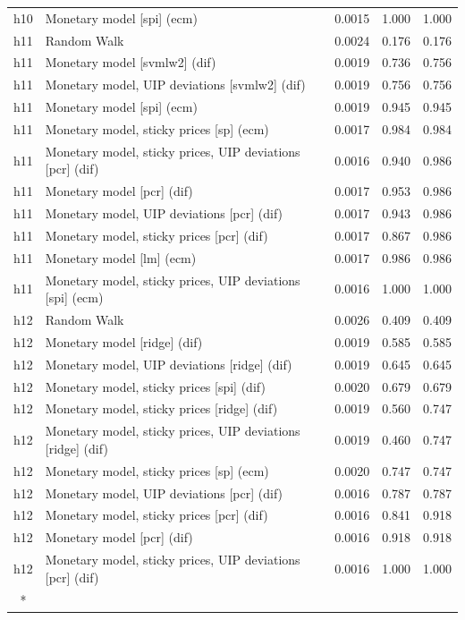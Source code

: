 \begin{ThreePartTable}
\begin{longtable}[t]{cp{5.5cm}ccc}
h10 & \raggedright Monetary model [spi] (ecm) & 0.0015 & 1.000 & 1.000\\
\addlinespace
h11 & \raggedright Random Walk & 0.0024 & 0.176 & 0.176\\
h11 & \raggedright Monetary model [svmlw2] (dif) & 0.0019 & 0.736 & 0.756\\
h11 & \raggedright Monetary model, UIP deviations [svmlw2] (dif) & 0.0019 & 0.756 & 0.756\\
h11 & \raggedright Monetary model [spi] (ecm) & 0.0019 & 0.945 & 0.945\\
h11 & \raggedright Monetary model, sticky prices [sp] (ecm) & 0.0017 & 0.984 & 0.984\\
h11 & \raggedright Monetary model, sticky prices, UIP deviations [pcr] (dif) & 0.0016 & 0.940 & 0.986\\
h11 & \raggedright Monetary model [pcr] (dif) & 0.0017 & 0.953 & 0.986\\
h11 & \raggedright Monetary model, UIP deviations [pcr] (dif) & 0.0017 & 0.943 & 0.986\\
h11 & \raggedright Monetary model, sticky prices [pcr] (dif) & 0.0017 & 0.867 & 0.986\\
h11 & \raggedright Monetary model [lm] (ecm) & 0.0017 & 0.986 & 0.986\\
h11 & \raggedright Monetary model, sticky prices, UIP deviations [spi] (ecm) & 0.0016 & 1.000 & 1.000\\
\addlinespace
h12 & \raggedright Random Walk & 0.0026 & 0.409 & 0.409\\
h12 & \raggedright Monetary model [ridge] (dif) & 0.0019 & 0.585 & 0.585\\
h12 & \raggedright Monetary model, UIP deviations [ridge] (dif) & 0.0019 & 0.645 & 0.645\\
h12 & \raggedright Monetary model, sticky prices [spi] (dif) & 0.0020 & 0.679 & 0.679\\
h12 & \raggedright Monetary model, sticky prices [ridge] (dif) & 0.0019 & 0.560 & 0.747\\
h12 & \raggedright Monetary model, sticky prices, UIP deviations [ridge] (dif) & 0.0019 & 0.460 & 0.747\\
h12 & \raggedright Monetary model, sticky prices [sp] (ecm) & 0.0020 & 0.747 & 0.747\\
h12 & \raggedright Monetary model, UIP deviations [pcr] (dif) & 0.0016 & 0.787 & 0.787\\
h12 & \raggedright Monetary model, sticky prices [pcr] (dif) & 0.0016 & 0.841 & 0.918\\
h12 & \raggedright Monetary model [pcr] (dif) & 0.0016 & 0.918 & 0.918\\
h12 & \raggedright Monetary model, sticky prices, UIP deviations [pcr] (dif) & 0.0016 & 1.000 & 1.000\\*
\end{longtable}
\end{ThreePartTable}
\endgroup{}
